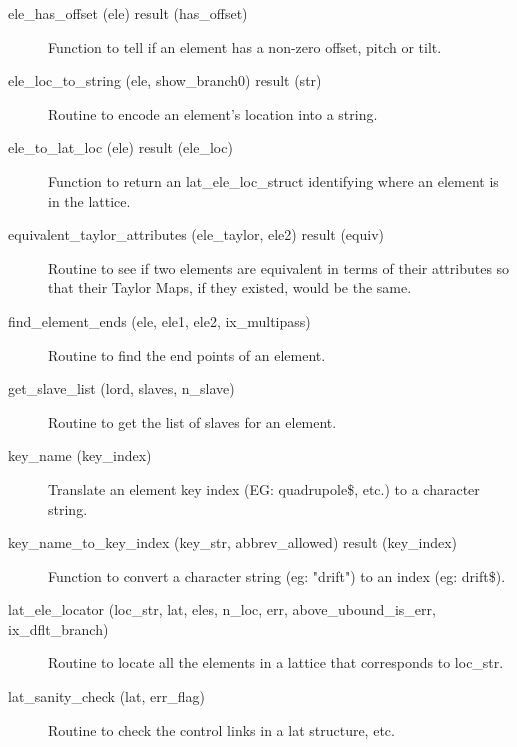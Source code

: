 \begin{description}
\label{r:ele.has.offset}
\item[ele_has_offset (ele) result (has_offset)] \Newline 
Function to tell if an element has a non-zero offset, pitch or tilt.

\label{r:ele.loc.to.string}
\item[ele_loc_to_string (ele, show_branch0) result (str)] \Newline 
Routine to encode an element's location into a string.

\label{r:ele.to.lat.loc}
\item[ele_to_lat_loc (ele) result (ele_loc)] \Newline 
Function to return an lat_ele_loc_struct identifying where an element is in the lattice.

\item[equivalent_taylor_attributes (ele_taylor, ele2) result (equiv)] \Newline 
Routine to see if two elements are equivalent in terms of their attributes so
that their Taylor Maps, if they existed, would be the same.

\label{r:find.element.ends}
\item[find_element_ends (ele, ele1, ele2, ix_multipass)] \Newline
Routine to find the end points of an element. 

\label{r:get.slave.list}
\item[get_slave_list (lord, slaves, n_slave)] \Newline 
Routine to get the list of slaves for an element.

\label{r:key.name}
\item[{key_name (key_index)}] \Newline
Translate an element key index (EG: quadrupole\$, etc.) to a character string.

\label{r:key.name.to.key.index}
\item[key_name_to_key_index (key_str, abbrev_allowed) result (key_index)] \Newline 
Function to convert a character string  (eg: "drift") to an index (eg: drift\$).

\label{r:lat.ele.locator}
\item[lat_ele_locator (loc_str, lat, eles, n_loc, err, 
            above_ubound_is_err, ix_dflt_branch)] \Newline 
Routine to locate all the elements in a lattice that corresponds to loc_str. 

\label{r:lat.sanity.check}
\item[lat_sanity_check (lat, err_flag)] \Newline
Routine to check the control links in a lat structure, etc.


\end{description}
